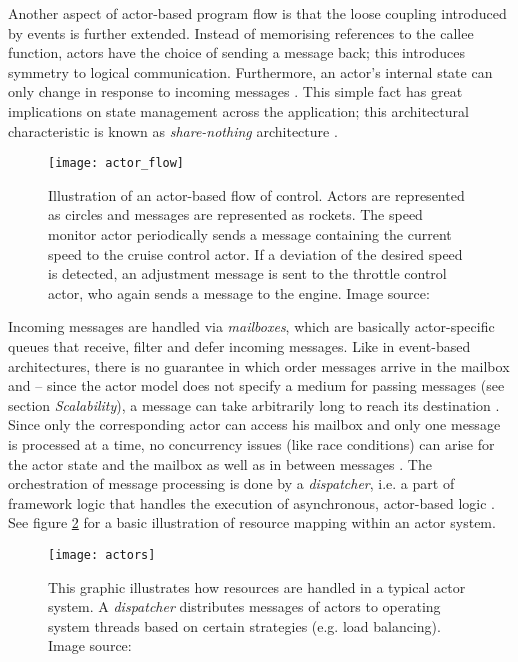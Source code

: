 Another aspect of actor-based program flow is that the loose coupling introduced by events is further extended. Instead of memorising references to the callee function, actors have the choice of sending a message back; this introduces symmetry to logical communication. Furthermore, an actor's internal state can only change in response to incoming messages \cite[p. 38]{Haller2011}. This simple fact has great implications on state management across the application; this architectural characteristic is known as \textit{share-nothing} architecture \cite[p. 3]{Bonetta}.

\begin{figure}
\centering\small
\setlength{\tabcolsep}{0mm}
  \texttt{[image: actor\_flow]}
\caption{
Illustration of an actor-based flow of control. Actors are represented as circles and messages are represented as rockets. The speed monitor actor periodically sends a message containing the current speed to the cruise control actor. If a deviation of the desired speed is detected, an adjustment message is sent to the throttle control actor, who again sends a message to the engine. Image source: \cite{Haller2011}
}
\label{fig:actor_flow}
\end{figure}

Incoming messages are handled via \textit{mailboxes}, which are basically actor-specific queues that receive, filter and defer incoming messages. Like in event-based architectures, there is no guarantee in which order messages arrive in the mailbox and -- since the actor model does not specify a medium for passing messages (see section \textit{Scalability}), a message can take arbitrarily long to reach its destination \cite[97]{Erb2012}. Since only the corresponding actor can access his mailbox and only one message is processed at a time, no concurrency issues (like race conditions) can arise for the actor state and the mailbox as well as in between messages \cite[p. 12]{Eriksson2013}. The orchestration of message processing is done by a \textit{dispatcher}, i.e. a part of framework logic that handles the execution of asynchronous, actor-based logic \cite[p. 97]{Gupta2012}. See figure \ref{fig:gil} for a basic illustration of resource mapping within an actor system.

\begin{figure}
\centering\small
\setlength{\tabcolsep}{0mm}
  \texttt{[image: actors]}
\caption{This graphic illustrates how resources are handled in a typical actor system. A \textit{dispatcher} distributes messages of actors to operating system threads based on certain strategies (e.g. load balancing). Image source: \cite{Gupta2012}}
\label{fig:gil}
\end{figure}


